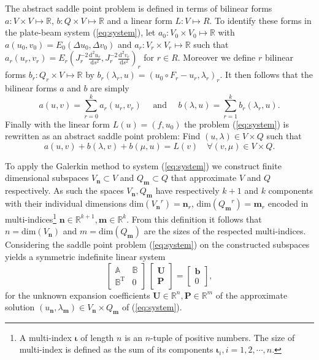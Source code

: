 \documentclass{marine_2015}
\newcommand{\Uvec}{\ensuremath{\mathbf{U}}}
\newcommand{\Pvec}{\ensuremath{\mathbf{P}}}
\newcommand{\inner}[2]{\ensuremath{\left(#1, #2\right)}}
\newcommand{\rinner}[2]{\ensuremath{\left(#1, #2\right)_r}}
\newcommand{\ainner}[2]{\ensuremath{a\left(#1, #2\right)}}
\newcommand{\arinner}[2]{\ensuremath{a_r\left(#1, #2\right)}}
\newcommand{\binner}[2]{\ensuremath{b\left(#1, #2\right)}}
\newcommand{\brinner}[2]{\ensuremath{b_r\left(#1, #2\right)}}
\newcommand{\Linner}[1]{\ensuremath{L\left(#1\right)}}
\newcommand{\Vh}{\ensuremath{V_{\mathbf{n}}}}
\newcommand{\Qh}{\ensuremath{Q_{\mathbf{m}}}}
\newcommand{\tderiv}[2]{\ensuremath{\tfrac{\mathrm{d}#1}{\mathrm{d}#2}}}
\begin{document}
The abstract saddle point problem is defined in terms of bilinear forms $a:V\times V\mapsto \mathbb{R}$,
$b:Q\times V\mapsto \mathbb{R}$ and a linear form $L:V\mapsto R$. To identify these 
forms in the plate-beam system (\ref{eq:system}), let $a_0:V_0\times V_0\mapsto
\mathbb{R}$ with $\ainner{u_0}{v_0}=E_0\inner{\Delta u_0}{\Delta v_0}$ and
$a_r:V_r\times V_r\mapsto \mathbb{R}$ such that $\arinner{u_r}{v_r}=E_r\rinner{J_r^{-2}\tderiv{^2 u_r}{s^2}}{J_r^{-2}\tderiv{^2
v_r}{s^2}}$ for $r\in R$. Moreover we define $r$ bilinear forms
$b_r:Q_r\times V\mapsto\mathbb{R}$ by
$\brinner{\lambda_r}{u}=\rinner{u_0\circ F_r-u_r}{\lambda_r}$. It then follows 
that the bilinear forms $a$ and $b$ are simply
\[
  \ainner{u}{v} = \displaystyle\sum_{r=0}^{k}\arinner{u_r}{v_r}\quad\text{ and
  }\quad\binner{\lambda}{u} = \displaystyle\sum_{r=1}^{k}\brinner{\lambda_r}{u}.
\]
Finally with the linear form $\Linner{u}=\inner{f}{u_0}$ the problem
(\ref{eq:system}) is rewritten as an abstract saddle point problem: Find
$\left(u, \lambda\right)\in V\times Q$ such that
\begin{equation}
  \label{eq:abstract_saddle}
  \ainner{u}{v} + \binner{\lambda}{v} + \binner{\mu}{u} = \Linner{v}\quad\forall
  \left(v, \mu\right)\in V\times Q.
\end{equation}

To apply the Galerkin method to system (\ref{eq:system}) we construct finite dimensional
subspaces $\Vh\subset V$ and $\Qh\subset Q$ that approximate $V$ and $Q$
respectively. As such the spaces $\Vh, \Qh$ have respectively $k+1$ and $k$
components with their individual dimensions
$\text{dim}\left(\Vh^r\right)=\mathbf{n}_r$, $\text{dim}\left(\Qh^r\right)=\mathbf{m}_r$ 
encoded in multi-indices\footnote{A multi-index $\mathbf{\iota}$ of length $n$
is an $n$-tuple of positive numbers. The size of multi-index is defined as the
sum of its components $\mathbf{\iota}_i, i=1, 2, \cdots, n$.} $\mathbf{n}\in\mathbb{R}^{k+1}, \mathbf{m}\in\mathbb{R}^k$.
From this definition it follows that $n=\text{dim}\left(\Vh\right)$ and $m=\text{dim}\left(\Qh\right)$
are the sizes of the respected multi-indices. Considering the saddle point
problem (\ref{eq:system}) on the constructed subspaces yields a symmetric
indefinite linear system
\begin{equation}
  \label{eq:sysAB}
    \begin{bmatrix}
      \mathbb{A} & \mathbb{B} \\
      \mathbb{B}^{\text{T}} & 0
    \end{bmatrix}
    \,
    \begin{bmatrix}
      \mathbf{U} \\
      \mathbf{P}
    \end{bmatrix}
    =
    \begin{bmatrix}
      \mathbf{b}\\
      0
    \end{bmatrix},
\end{equation}
for the unknown expansion coefficients $\Uvec\in\mathbb{R}^n,
\Pvec\in\mathbb{R}^m$ of the approximate solution
$\left(u_\mathbf{n}, \lambda_{\mathbf{m}}\right)\in \Vh \times \Qh$ of
(\ref{eq:system}).
\end{document}
